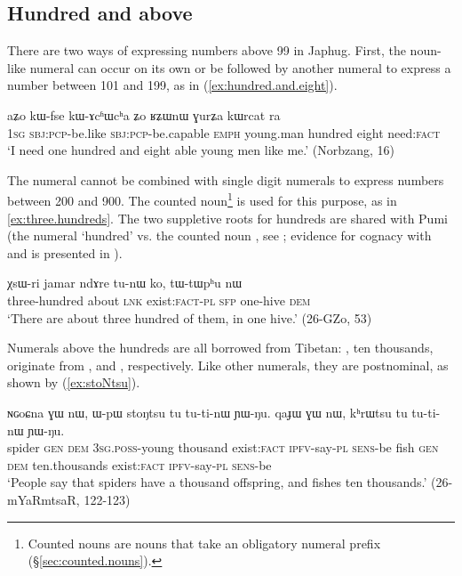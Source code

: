\subsection{Hundred and above} \label{sec.hundred.plus}
There are two ways of expressing numbers above 99 in Japhug. First, the noun-like numeral  can occur on its own or be followed by another numeral to express a number between 101 and 199, as in (\ref{ex:hundred.and.eight}).

\begin{exe}
\ex \label{ex:hundred.and.eight}
\gll aʑo kɯ-fse kɯ-ɤcʱɯcʰa ʑo ʁʑɯnɯ ɣurʑa kɯrcat ra\\
\textsc{1sg} \textsc{sbj}:\textsc{pcp}-be.like  \textsc{sbj}:\textsc{pcp}-be.capable \textsc{emph} young.man hundred eight need:\textsc{fact} \\
\glt `I need one hundred and eight able young men like me.' (Norbzang, 16)
\end{exe}

The numeral  cannot be combined with single digit numerals to express numbers between 200 and 900. The counted noun\footnote{Counted nouns are nouns that take an obligatory numeral prefix (§\ref{sec:counted.nouns}). }  is used for this purpose, as in \ref{ex:three.hundreds}. The two suppletive roots for hundreds are shared with Pumi (the numeral  `hundred' vs. the counted noun , see \citealt[101]{daudey14grammar}; evidence for cognacy with  and  is presented in \citealt{jacques17num}).

\begin{exe}
\ex \label{ex:three.hundreds}
\gll χsɯ-ri jamar ndɤre tu-nɯ ko, tɯ-tɯpʰu nɯ \\
three-hundred about \textsc{lnk} exist:\textsc{fact}-\textsc{pl} \textsc{sfp} one-hive \textsc{dem} \\
\glt `There are about three hundred of them, in one hive.' (26-GZo, 53)
\end{exe}
 
Numerals above the hundreds are all borrowed from Tibetan: ,  {ten thousands},  originate from ,  and , respectively.  Like other numerals, they are postnominal, as shown by (\ref{ex:stoNtsu}).


\begin{exe}
\ex \label{ex:stoNtsu}
\gll ɴɢoɕna ɣɯ nɯ, ɯ-pɯ stoŋtsu tu tu-ti-nɯ ɲɯ-ŋu. qaɟɯ ɣɯ nɯ, kʰrɯtsu tu tu-ti-nɯ ɲɯ-ŋu. \\
spider \textsc{gen} \textsc{dem} \textsc{3sg}.\textsc{poss}-young thousand exist:\textsc{fact} \textsc{ipfv}-say-\textsc{pl} \textsc{sens}-be fish \textsc{gen} \textsc{dem} ten.thousands exist:\textsc{fact} \textsc{ipfv}-say-\textsc{pl} \textsc{sens}-be  \\
\glt `People say that spiders have a thousand offspring, and fishes ten thousands.' (26-mYaRmtsaR, 122-123)
\end{exe}

